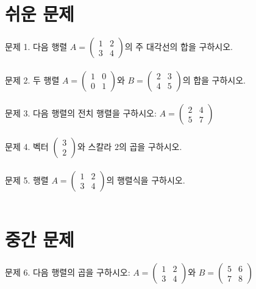 \documentclass[fleqn]{article}
\begin{document}
      
        \section*{쉬운 문제}

\noindent 문제 1. 다음 행렬 \( A = \begin{pmatrix} 1 & 2 \\ 3 & 4 \end{pmatrix} \)의 주 대각선의 합을 구하시오. \\\\

\noindent 문제 2. 두 행렬 \( A = \begin{pmatrix} 1 & 0 \\ 0 & 1 \end{pmatrix} \)와 \( B = \begin{pmatrix} 2 & 3 \\ 4 & 5 \end{pmatrix} \)의 합을 구하시오. \\\\

\noindent 문제 3. 다음 행렬의 전치 행렬을 구하시오: \( A = \begin{pmatrix} 2 & 4 \\ 5 & 7 \end{pmatrix} \) \\\\

\noindent 문제 4. 벡터 \( \begin{pmatrix} 3 \\ 2 \end{pmatrix} \)와 스칼라 \( 2 \)의 곱을 구하시오. \\\\

\noindent 문제 5. 행렬 \( A = \begin{pmatrix} 1 & 2 \\ 3 & 4 \end{pmatrix} \)의 행렬식을 구하시오. \\\\

\section*{중간 문제}

\noindent 문제 6. 다음 행렬의 곱을 구하시오: \( A = \begin{pmatrix} 1 & 2 \\ 3 & 4 \end{pmatrix} \)와 \( B = \begin{pmatrix} 5 & 6 \\ 7 & 8 \end{pmatrix} \) \\\\
\end{document}
